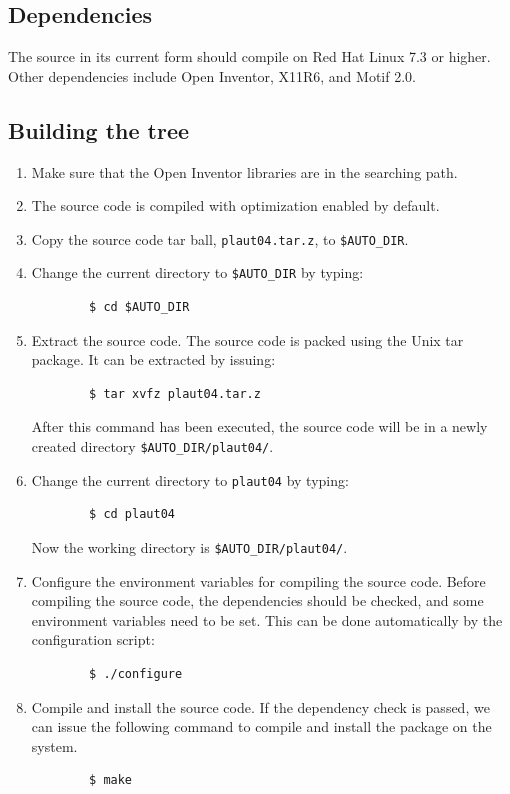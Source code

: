 \subsection{Dependencies}

    The source in its current form should compile on Red Hat Linux 7.3 or higher.
    Other dependencies include Open Inventor, X11R6, and
    Motif 2.0. 

\subsection{Building the tree}

    \begin{enumerate}
    \item Make sure that the Open Inventor libraries are in the searching path. 
    \item The source code is compiled with optimization enabled by default.
	\item Copy the source code tar ball, \texttt{plaut04.tar.z}, to \texttt{\$AUTO\_DIR}.
	\item Change the current directory to \texttt{\$AUTO\_DIR} by typing:
	\begin{verbatim}
	    $ cd $AUTO_DIR 
	\end{verbatim}
	\item Extract the source code. The source code is packed using the Unix tar package. 
	It can be extracted by issuing:
	\begin{verbatim}
	    $ tar xvfz plaut04.tar.z
	\end{verbatim}
	After this command has been executed, the source code will be in a newly created
	directory \texttt{\$AUTO\_DIR/plaut04/}.
	\item Change the current directory to \texttt{plaut04} by typing: 
	\begin{verbatim}
	    $ cd plaut04 
	\end{verbatim}
	Now the working directory is \texttt{\$AUTO\_DIR/plaut04/}.
    \item Configure the environment variables for compiling the source code. 
	Before compiling the source code, the dependencies should be checked, and some environment variables need to be set.
	This can be done automatically by the configuration script:
	\begin{verbatim}
	    $ ./configure 
	\end{verbatim}
    \item Compile and install the source code. If the dependency check is passed, 
	we can issue the following command to compile and install the package on the system.
	\begin{verbatim}
	    $ make
	\end{verbatim}
    \end{enumerate}

